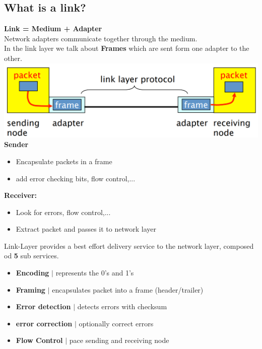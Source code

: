 \documentclass[a4paper, fontsize=8pt, landscape, DIV=1]{scrartcl}
\begin{document}
\begin{multicols*}{4}
   			\subsection{What is a link?}
   			\textbf{Link =  Medium + Adapter}\\
   			Network adapters communicate together through the medium.\\
   			In the link layer we talk about \textbf{Frames} which are sent form one adapter to the other.\\
   			\includegraphics[width=\columnwidth]{images/Link_Layer/link.png} 
   			\textbf{Sender}
   			\vspace{-0.3cm}
   			\begin{itemize}[noitemsep]
   				\item Encapsulate packets in a frame
   				\item add error checking bits, flow control,...
   			\end{itemize}
   			\textbf{Receiver:}
   			\vspace{-0.3cm}
   			\begin{itemize}[noitemsep]
   				\item Look for errors, flow control,...
   				\item Extract packet and passes it to network layer 
   			\end{itemize}
   			Link-Layer provides a best effort delivery service to the network layer, composed od \textbf{5} sub services.
   			\begin{itemize}[noitemsep]
   				\item \textbf{Encoding} $\vert$ represents the 0's and 1's
   				\item \textbf{Framing} $\vert$ encapsulates packet into a frame (header/trailer)
   				\item \textbf{Error detection} $\vert$ detects errors with checksum
   				\item \textbf{error correction} $\vert$ optionally correct errors
   				\item \textbf{Flow Control} $\vert$ pace sending and receiving node 
   			\end{itemize} 
   			

\end{multicols*}
\end{document}
